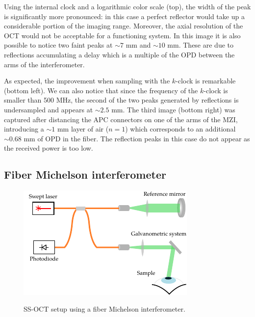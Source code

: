 Using the internal clock and a logarithmic color scale (top), the width of the peak is significantly more pronounced: in this case a perfect reflector would take up a considerable portion of the imaging range. Moreover, the axial resolution of the OCT would not be acceptable for a functioning system. In this image it is also possible to notice two faint peaks at $\sim 7$ mm and $\sim 10$ mm. These are due to reflections accumulating a delay which is a multiple of the OPD between the arms of the interferometer. 

As expected, the improvement when sampling with the $k$-clock is remarkable (bottom left). We can also notice that since the frequency of the $k$-clock is smaller than 500 MHz, the second of the two peaks generated by reflections is undersampled and appears at $\sim 2.5$ mm. The third image (bottom right) was captured after distancing the APC connectors on one of the arms of the \ac{MZI}, introducing a $\sim 1$ mm layer of air ($n=1$) which corresponds to an additional $\sim 0.68$ mm of OPD in the fiber. The reflection peaks in this case do not appear as the received power is too low. 


\subsection{Fiber Michelson interferometer}

\begin{figure}[bth]
	\myfloatalign
	{\includegraphics[width=0.8\linewidth]{gfx/setup-diagrams/basic-oct.pdf}}
	\caption{SS-OCT setup using a fiber Michelson interferometer.}\label{fig:basic-oct}
\end{figure}


